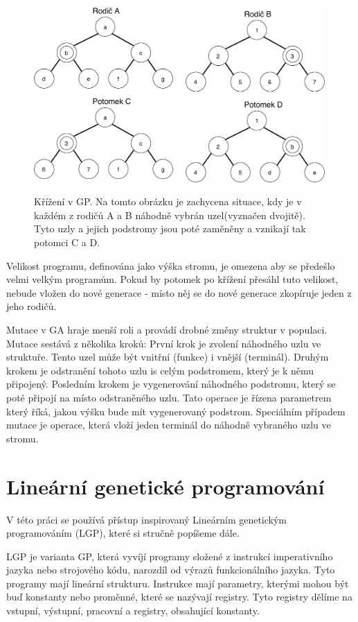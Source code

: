 \begin{figure}[h]
    \centering
    {\includegraphics[width=30em]{obrazky/gp_krizeni.pdf}}
    \caption{
    Křížení v GP.
    Na tomto obrázku je zachycena situace, kdy je v každém z rodičů A a B náhodně vybrán uzel(vyznačen dvojitě).
    Tyto uzly a jejich podstromy jsou poté zaměněny a vznikají tak potomci C a D.
    }
    \label{fig:GP_krizeni}
\end{figure}

Velikost programu, definována jako výška stromu, je omezena aby se předešlo velmi velkým programům.
Pokud by potomek po křížení přesáhl tuto velikost, nebude vložen do nové generace - místo něj se do nové generace zkopíruje jeden z jeho rodičů.

Mutace v GA hraje menší roli a provádí drobné změny struktur v populaci.
Mutace sestává z několika kroků:
První krok je zvolení náhodného uzlu ve struktuře.
Tento uzel může být vnitřní (funkce) i vnější (terminál).
Druhým krokem je odstranění tohoto uzlu is celým podstromem, který je k němu připojený.
Posledním krokem je vygenerování náhodného podstromu, který se poté připojí na místo odstraněného uzlu.
Tato operace je řízena parametrem který říká, jakou výšku bude mít vygenerovaný podstrom.
Speciálním případem mutace je operace, která vloží jeden terminál do náhodně vybraného uzlu ve stromu.

\section{Lineární genetické programování}
V této práci se používá přístup inspirovaný Lineárním genetickým programováním (LGP), které si stručně popíšeme dále.

LGP je varianta GP, která vyvíjí programy složené z instrukcí imperativního jazyka nebo strojového kódu, narozdíl od výrazů funkcionálního jazyka.
Tyto programy mají lineární strukturu.
Instrukce mají parametry, kterými mohou být buď konstanty nebo proměnné, které se nazývají registry.
Tyto registry dělíme na vstupní, výstupní, pracovní a registry, obsahující konstanty.

